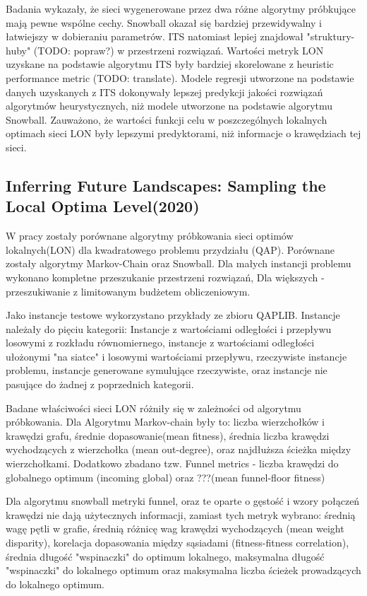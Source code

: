 Badania wykazały, że sieci wygenerowane przez dwa różne algorytmy próbkujące mają pewne wspólne cechy.
Snowball okazał się bardziej przewidywalny i łatwiejszy w dobieraniu parametrów.
ITS natomiast lepiej znajdował "struktury-huby" (TODO: popraw?) w przestrzeni rozwiązań.
Wartości metryk LON uzyskane na podstawie algorytmu ITS były bardziej skorelowane z
heuristic performance metric (TODO: translate).
Modele regresji utworzone na podstawie danych uzyskanych z ITS dokonywały lepszej predykcji
jakości rozwiązań algorytmów heurystycznych, niż modele utworzone na podstawie algorytmu Snowball.
Zauważono, że wartości funkcji celu w poszczególnych lokalnych optimach sieci LON
były lepszymi predyktorami, niż informacje o krawędziach tej sieci.

\subsection*{Inferring Future Landscapes: Sampling the Local Optima Level(2020)\cite{DBLP:journals/ec/ThomsonOVV20}}
W pracy zostały porównane algorytmy próbkowania sieci optimów lokalnych(LON) dla kwadratowego problemu przydziału (QAP).
Porównane zostały algorytmy Markov-Chain oraz Snowball.
Dla małych instancji problemu wykonano kompletne przeszukanie przestrzeni rozwiązań,
Dla większych - przeszukiwanie z limitowanym budżetem obliczeniowym.

Jako instancje testowe wykorzystano przykłady ze zbioru QAPLIB.
Instancje należały do pięciu kategorii: Instancje z wartościami odległości i przepływu losowymi z rozkładu równomiernego,
instancje z wartościami odległości ułożonymi "na siatce" i losowymi wartościami przepływu, rzeczywiste instancje problemu,
instancje generowane symulujące rzeczywiste, oraz instancje nie pasujące do żadnej z poprzednich kategorii.

Badane właściwości sieci LON różniły się w zależności od algorytmu próbkowania.
Dla Algorytmu Markov-chain były to: liczba wierzchołków i krawędzi grafu, średnie dopasowanie(mean fitness),
średnia liczba krawędzi wychodzących z wierzchołka (mean out-degree), oraz najdłuższa ścieżka między wierzchołkami.
Dodatkowo zbadano tzw. Funnel metrics - liczba krawędzi do globalnego optimum (incoming global) oraz ???(mean funnel-floor fitness)

Dla algorytmu snowball metryki funnel, oraz te oparte o gęstość i wzory połączeń krawędzi nie dają użytecznych informacji,
zamiast tych metryk wybrano: średnią wagę pętli w grafie, średnią różnicę wag krawędzi wychodzących (mean weight disparity),
korelacja dopasowania między sąsiadami (fitness-fitness correlation), średnia długość "wspinaczki" do optimum lokalnego,
maksymalna długość "wspinaczki" do lokalnego optimum oraz maksymalna liczba ścieżek prowadzących do lokalnego optimum.

